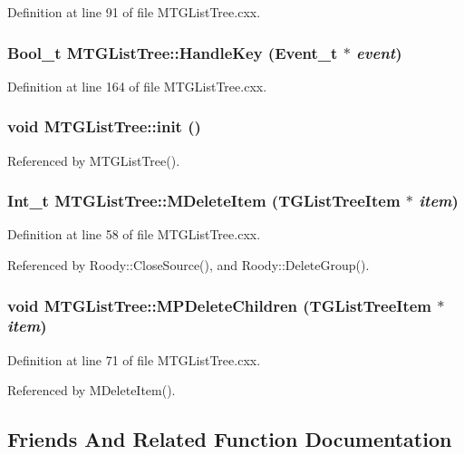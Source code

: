Definition at line 91 of file MTGListTree.cxx.
\subsubsection[{HandleKey}]{\setlength{\rightskip}{0pt plus 5cm}Bool\_\-t MTGListTree::HandleKey (Event\_\-t $\ast$ {\em event})}\label{classMTGListTree_add074bbcb2d9d8cd4227112c0178a592}


Definition at line 164 of file MTGListTree.cxx.
\subsubsection[{init}]{\setlength{\rightskip}{0pt plus 5cm}void MTGListTree::init ()\hspace{0.3cm}{\ttfamily  [private]}}\label{classMTGListTree_a9da47702de6d2875f4180ff793805701}


Referenced by MTGListTree().
\subsubsection[{MDeleteItem}]{\setlength{\rightskip}{0pt plus 5cm}Int\_\-t MTGListTree::MDeleteItem (TGListTreeItem $\ast$ {\em item})}\label{classMTGListTree_a16442d4287e49070a09f9ba37b43d12c}


Definition at line 58 of file MTGListTree.cxx.

Referenced by Roody::CloseSource(), and Roody::DeleteGroup().
\subsubsection[{MPDeleteChildren}]{\setlength{\rightskip}{0pt plus 5cm}void MTGListTree::MPDeleteChildren (TGListTreeItem $\ast$ {\em item})}\label{classMTGListTree_ab799a499555bfa3b17da435eb46e17e6}


Definition at line 71 of file MTGListTree.cxx.

Referenced by MDeleteItem().

\subsection{Friends And Related Function Documentation}
